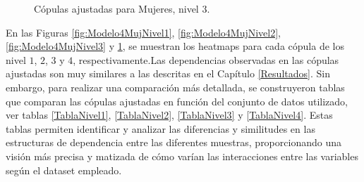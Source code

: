\begin{figure}[H]
 \centering
    \caption{Cópulas ajustadas para Mujeres, nivel $3$.}
    \label{fig:Modelo4MujNivel4}
\end{figure}


En las Figuras \ref{fig:Modelo4MujNivel1}, \ref{fig:Modelo4MujNivel2}, \ref{fig:Modelo4MujNivel3} y \ref{fig:Modelo4MujNivel4}, se muestran los heatmaps para cada cópula de los nivel $1$, $2$, $3$ y $4$, respectivamente.Las dependencias observadas en las cópulas ajustadas son muy similares a las descritas en el Capítulo \ref{Resultados}. Sin embargo, para realizar una comparación más detallada, se construyeron tablas que comparan las cópulas ajustadas en función del conjunto de datos utilizado, ver tablas \ref{TablaNivel1}, \ref{TablaNivel2}, \ref{TablaNivel3} y \ref{TablaNivel4}. Estas tablas permiten identificar y analizar las diferencias y similitudes en las estructuras de dependencia entre las diferentes muestras, proporcionando una visión más precisa y matizada de cómo varían las interacciones entre las variables según el dataset empleado.

